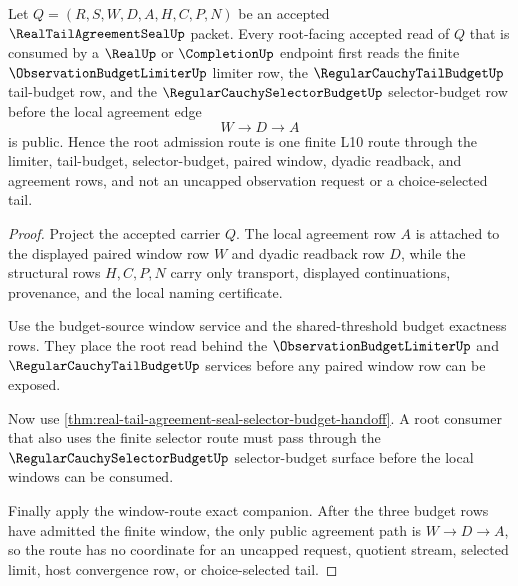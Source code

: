 \begin{theorem}
\label{thm:real-tail-agreement-seal-root-budget-selector-admission}
Let $Q=(R,S,W,D,A,H,C,P,N)$ be an accepted $\RealTailAgreementSealUp$ packet. Every root-facing accepted read of $Q$ that is consumed by a $\RealUp$ or $\CompletionUp$ endpoint first reads the finite $\ObservationBudgetLimiterUp$ limiter row, the $\RegularCauchyTailBudgetUp$ tail-budget row, and the $\RegularCauchySelectorBudgetUp$ selector-budget row before the local agreement edge
$$
W \to D \to A
$$
is public. Hence the root admission route is one finite L10 route through the limiter, tail-budget, selector-budget, paired window, dyadic readback, and agreement rows, and not an uncapped observation request or a choice-selected tail.
\end{theorem}
\begin{proof}
Project the accepted carrier $Q$. The local agreement row $A$ is attached to the displayed paired window row $W$ and dyadic readback row $D$, while the structural rows $H,C,P,N$ carry only transport, displayed continuations, provenance, and the local naming certificate.

Use the budget-source window service and the shared-threshold budget exactness rows. They place the root read behind the $\ObservationBudgetLimiterUp$ and $\RegularCauchyTailBudgetUp$ services before any paired window row can be exposed.

Now use \autoref{thm:real-tail-agreement-seal-selector-budget-handoff}. A root consumer that also uses the finite selector route must pass through the $\RegularCauchySelectorBudgetUp$ selector-budget surface before the local windows can be consumed.

Finally apply the window-route exact companion. After the three budget rows have admitted the finite window, the only public agreement path is $W \to D \to A$, so the route has no coordinate for an uncapped request, quotient stream, selected limit, host convergence row, or choice-selected tail.
\end{proof}

